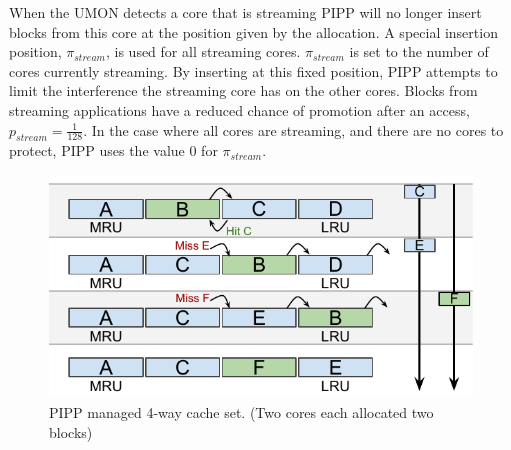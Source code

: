 When the UMON detects a core that is streaming PIPP will no longer insert blocks from this core at the position given by the allocation.
A special insertion position, $\pi_{stream}$, is used for all streaming cores.
$\pi_{stream}$ is set to the number of cores currently streaming. 
By inserting at this fixed position, PIPP attempts to limit the interference the streaming core has on the other cores.
Blocks from streaming applications have a reduced chance of promotion after an access, $p_{stream} = \frac{1}{128}$.
In the case where all cores are streaming, and there are no cores to protect, PIPP uses the value 0 for $\pi_{stream}$.

\begin{figure}[ht]
    \centering
    \includegraphics[width=.65\textwidth]{figures/algorithms/PIPP}
    \caption[PIPP managed 4-way cache set.]{PIPP managed 4-way cache set. (Two cores each allocated two blocks)}
    \label{fig:algorithms:pipp_example}
\end{figure}